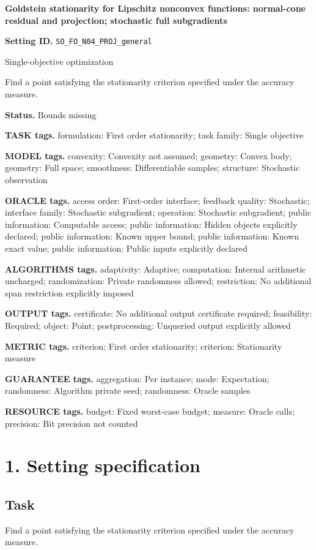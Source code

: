 \documentclass[10pt,a4paper]{article}
\begin{document}
\raggedright

{\LARGE\bfseries\sffamily\color{AtlasNavy} Goldstein stationarity for Lipschitz nonconvex functions: normal-cone residual and projection; stochastic full subgradients\par}\vspace{5pt}
\textbf{Setting ID.} \texttt{SO\_\allowbreak{}FO\_\allowbreak{}N04\_\allowbreak{}PROJ\_\allowbreak{}general}

Single-objective optimization

Find a point satisfying the stationarity criterion specified under the accuracy measure.

\textbf{Status.} Bounds missing

\textbf{TASK tags.} formulation: First order stationarity; task family: Single objective

\textbf{MODEL tags.} convexity: Convexity not assumed; geometry: Convex body; geometry: Full space; smoothness: Differentiable samples; structure: Stochastic observation

\textbf{ORACLE tags.} access order: First-order interface; feedback quality: Stochastic; interface family: Stochastic subgradient; operation: Stochastic subgradient; public information: Computable access; public information: Hidden objects explicitly declared; public information: Known upper bound; public information: Known exact value; public information: Public inputs explicitly declared

\textbf{ALGORITHMS tags.} adaptivity: Adaptive; computation: Internal arithmetic uncharged; randomization: Private randomness allowed; restriction: No additional span restriction explicitly imposed

\textbf{OUTPUT tags.} certificate: No additional output certificate required; feasibility: Required; object: Point; postprocessing: Unqueried output explicitly allowed

\textbf{METRIC tags.} criterion: First order stationarity; criterion: Stationarity measure

\textbf{GUARANTEE tags.} aggregation: Per instance; mode: Expectation; randomness: Algorithm private seed; randomness: Oracle samples

\textbf{RESOURCE tags.} budget: Fixed worst-case budget; measure: Oracle calls; precision: Bit precision not counted

\section{1. Setting specification}
\subsection{Task}
Find a point satisfying the stationarity criterion specified under the accuracy measure.
\end{document}
